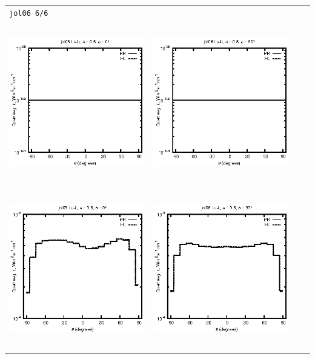 \begin{tabular}{c c c c}
\multicolumn{4}{l}{\texttt{jol06 6/6}} \\
\includegraphics[height=7cm]{../eps/jol06_Lu_b_fwd.eps} &
\includegraphics[height=7cm]{../eps/jol06_Lu_b_cross.eps} \\
\includegraphics[height=7cm]{../eps/jol06_Lu_it_fwd.eps} &
\includegraphics[height=7cm]{../eps/jol06_Lu_it_cross.eps} \\

\end{tabular}
